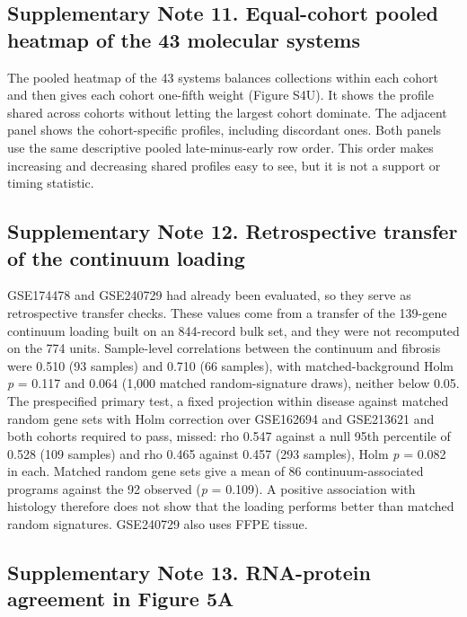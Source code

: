 \subsection{Supplementary Note 11. Equal-cohort pooled heatmap of the 43 molecular systems}\label{supplementary-note-11.-equal-cohort-pooled-heatmap-of-the-43-molecular-systems}

The pooled heatmap of the 43 systems balances collections within each cohort and then gives each cohort one-fifth weight (Figure S4U). It shows the profile shared across cohorts without letting the largest cohort dominate. The adjacent panel shows the cohort-specific profiles, including discordant ones. Both panels use the same descriptive pooled late-minus-early row order. This order makes increasing and decreasing shared profiles easy to see, but it is not a support or timing statistic.

\subsection{Supplementary Note 12. Retrospective transfer of the continuum loading}\label{supplementary-note-12.-retrospective-transfer-of-the-continuum-loading}

GSE174478 and GSE240729 had already been evaluated, so they serve as retrospective transfer checks. These values come from a transfer of the 139-gene continuum loading built on an 844-record bulk set, and they were not recomputed on the 774 units. Sample-level correlations between the continuum and fibrosis were 0.510 (93 samples) and 0.710 (66 samples), with matched-background Holm \emph{p} = 0.117 and 0.064 (1,000 matched random-signature draws), neither below 0.05. The prespecified primary test, a fixed projection within disease against matched random gene sets with Holm correction over GSE162694 and GSE213621 and both cohorts required to pass, missed: rho 0.547 against a null 95th percentile of 0.528 (109 samples) and rho 0.465 against 0.457 (293 samples), Holm \emph{p} = 0.082 in each. Matched random gene sets give a mean of 86 continuum-associated programs against the 92 observed (\emph{p} = 0.109). A positive association with histology therefore does not show that the loading performs better than matched random signatures. GSE240729 also uses FFPE tissue.

\subsection{Supplementary Note 13. RNA-protein agreement in Figure 5A}\label{supplementary-note-13.-rna-protein-agreement-in-figure-5a}

